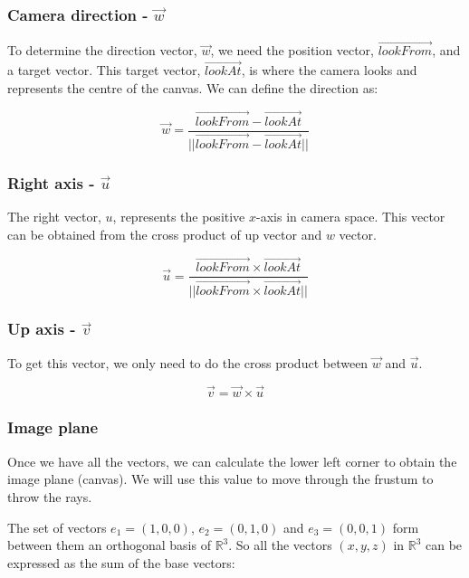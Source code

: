 \documentclass[titlepage,12pt]{report}
\begin{document}
\subsubsection{Camera direction - $\vec{w}$}

To determine the direction vector, $\vec{w}$, we need the position vector, $\vec{lookFrom}$, and a target vector. This target vector, $\vec{lookAt}$, is where the camera looks and represents the centre of the canvas. We can define the direction as:

\begin{equation}
\vec{w} = \frac{\vec{lookFrom} - \vec{lookAt}}{||\vec{lookFrom} - \vec{lookAt}||}
\end{equation}

\subsubsection{Right axis - $\vec{u}$}

The right vector, $u$, represents the positive $x$-axis in camera space. This vector can be obtained from the cross product of up vector and $w$ vector.

\begin{equation}
\vec{u} = \frac{\vec{lookFrom} \times \vec{lookAt}}{||\vec{lookFrom} \times \vec{lookAt}||}
\end{equation}

\subsubsection{Up axis - $\vec{v}$}

To get this vector, we only need to do the cross product between $\vec{w}$ and $\vec{u}$. 

\begin{equation}
\vec{v} = \vec{w} \times \vec{u}
\end{equation}

\subsubsection{Image plane}

Once we have all the vectors, we can calculate the lower left corner to obtain the image plane (canvas). We will use this value to move through the frustum to throw the rays.

The set of vectors $e_1 = (1,0,0)$, $e_2 = (0,1,0)$ and $e_3 = (0,0,1)$ form between them an orthogonal basis of $\mathbb{R}^3$. So all the vectors $(x,y,z)$ in $\mathbb{R}^3$ can be expressed as the sum of the base vectors:
\end{document}
